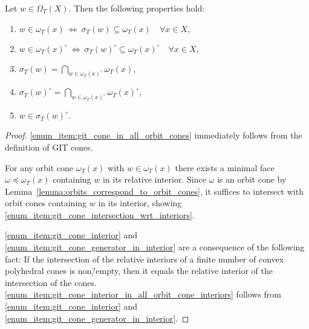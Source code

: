 \begin{lemma}
	\label{lemma:git_cones_alternative_descriptions}
	Let $w\in\Omega	_T(X)$. Then the following properties hold:
	\begin{enumerate}[label={\upshape(\roman*)}]
		\item $w\in \omega_T(x) \ \Leftrightarrow\ \sigma_T(w) \subseteq \omega_T(x)\quad \forall x\in X,$
		\label{enum_item:git_cone_in_all_orbit_cones}
		\item $w\in \omega_T(x)^\circ \ \Leftrightarrow\ \sigma_T(w)^\circ \subseteq \omega_T(x)^\circ\quad \forall x\in X,$
		\label{enum_item:git_cone_interior_in_all_orbit_cone_interiors}
		\item $\sigma_T(w) = \bigcap\limits_{w\in \omega_T(x)^\circ} \omega_T(x),$
		\label{enum_item:git_cone_intersection_wrt_interiors}
		\item $\sigma_T(w)^\circ = \bigcap\limits_{w\in \omega_T(x)^\circ} \omega_T(x)^\circ,$
		\label{enum_item:git_cone_interior}
		\item $w\in\sigma_T(w)^\circ.$
		\label{enum_item:git_cone_generator_in_interior}
	\end{enumerate}
\end{lemma}
\begin{proof}
	\ref{enum_item:git_cone_in_all_orbit_cones} immediately follows from the definition of GIT cones.
	
	For any orbit cone $\omega_T(x)$ with $w\in\omega_T(x)$ there exists a minimal face $\omega\preceq \omega_T(x)$ containing $w$ in its relative interior. Since $\omega$ is an orbit cone by Lemma~\ref{lemma:orbits_correspond_to_orbit_cones}, it suffices to intersect with orbit cones containing $w$ in its interior, showing \ref{enum_item:git_cone_intersection_wrt_interiors}.
	
	\ref{enum_item:git_cone_interior} and \ref{enum_item:git_cone_generator_in_interior} are a consequence of the following fact: If the intersection of the relative interiors of a finite number of convex polyhedral cones is non\=/empty, then it equals the relative interior of the intersection of the cones. \ref{enum_item:git_cone_interior_in_all_orbit_cone_interiors} follows from \ref{enum_item:git_cone_interior} and \ref{enum_item:git_cone_generator_in_interior}.
\end{proof}

